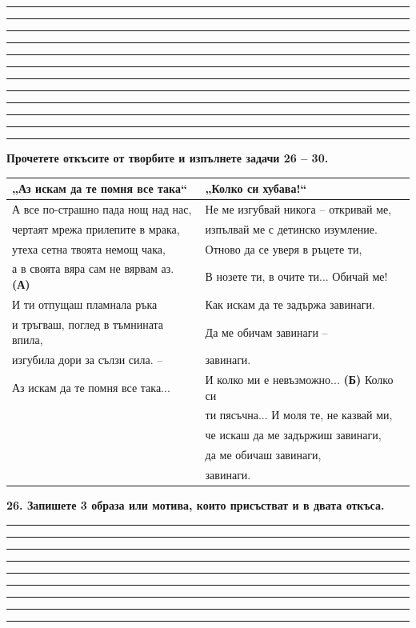 \documentclass[12pt,a4paper]{article}
\begin{document}
\vspace{0.3cm}
\noindent\rule{\linewidth}{0.4pt}
\noindent\rule{\linewidth}{0.4pt}
\noindent\rule{\linewidth}{0.4pt}
\noindent\rule{\linewidth}{0.4pt}
\noindent\rule{\linewidth}{0.4pt}
\noindent\rule{\linewidth}{0.4pt}
\noindent\rule{\linewidth}{0.4pt}
\noindent\rule{\linewidth}{0.4pt}
\noindent\rule{\linewidth}{0.4pt}
\noindent\rule{\linewidth}{0.4pt}
\noindent\rule{\linewidth}{0.4pt}
\noindent\rule{\linewidth}{0.4pt}

\vspace{0.6cm}

\noindent
\textbf{Прочетете откъсите от творбите и изпълнете задачи 26 – 30.}

\vspace{0.3cm}

\noindent
\begin{tabularx}{\linewidth}{|>{\raggedright\arraybackslash}X|>{\raggedright\arraybackslash}X|}
\hline
\textbf{„Аз искам да те помня все така“} & \textbf{„Колко си хубава!“} \\
\hline
А все по-страшно пада нощ над нас, & Не ме изгубвай никога – откривай ме, \\
чертаят мрежа прилепите в мрака, & изпълвай ме с детинско изумление. \\
утеха сетна твоята немощ чака, & Отново да се уверя в ръцете ти, \\
а в своята вяра сам не вярвам аз. \textbf{(А)} & В нозете ти, в очите ти... Обичай ме! \\
И ти отпущаш пламнала ръка & Как искам да те задържа завинаги. \\
и тръгваш, поглед в тъмнината впила, & Да ме обичам завинаги – \\
изгубила дори за сълзи сила. – & завинаги. \\
Аз искам да те помня все така... & И колко ми е невъзможно... \textbf{(Б)} Колко си \\
& ти пясъчна... И моля те, не казвай ми, \\
& че искаш да ме задържиш завинаги, \\
& да ме обичаш завинаги, \\
& завинаги. \\
\hline
\end{tabularx}

\vspace{0.6cm}

\noindent
\textbf{26. Запишете 3 образа или мотива, които присъстват и в двата откъса.}\\
\noindent\rule{\linewidth}{0.4pt}
\noindent\rule{\linewidth}{0.4pt}
\noindent\rule{\linewidth}{0.4pt}
\noindent\rule{\linewidth}{0.4pt}
\noindent\rule{\linewidth}{0.4pt}
\noindent\rule{\linewidth}{0.4pt}
\noindent\rule{\linewidth}{0.4pt}
\noindent\rule{\linewidth}{0.4pt}
\noindent\rule{\linewidth}{0.4pt}
\end{document}
